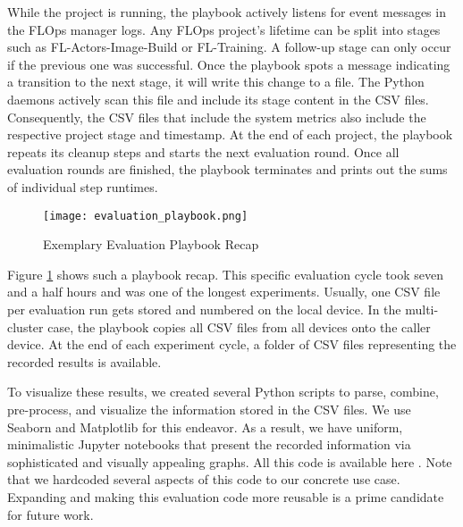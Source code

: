 While the project is running, the playbook actively listens for event messages in the FLOps manager logs.
Any FLOps project's lifetime can be split into stages such as FL-Actors-Image-Build or FL-Training.
A follow-up stage can only occur if the previous one was successful.
Once the playbook spots a message indicating a transition to the next stage, it will write this change to a file.
The Python daemons actively scan this file and include its stage content in the CSV files.
Consequently, the CSV files that include the system metrics also include the respective project stage and timestamp.
At the end of each project, the playbook repeats its cleanup steps and starts the next evaluation round.
Once all evaluation rounds are finished, the playbook terminates and prints out the sums of individual step runtimes. 
\begin{figure}[h]
        \centering
        \texttt{[image: evaluation\_playbook.png]}
        \caption{Exemplary Evaluation Playbook Recap}
        \label{fig:evaluation_playbook_result}
\end{figure}
Figure \ref{fig:evaluation_playbook_result} shows such a playbook recap.
This specific evaluation cycle took seven and a half hours and was one of the longest experiments.
Usually, one CSV file per evaluation run gets stored and numbered on the local device.
In the multi-cluster case, the playbook copies all CSV files from all devices onto the caller device.
At the end of each experiment cycle, a folder of CSV files representing the recorded results is available.

To visualize these results, we created several Python scripts to parse, combine, pre-process, and visualize the information stored in the CSV files.
We use Seaborn and Matplotlib for this endeavor.
As a result, we have uniform, minimalistic Jupyter notebooks that present the recorded information via sophisticated and visually appealing graphs.
All this code is available here \cite{cli_code}.
Note that we hardcoded several aspects of this code to our concrete use case.
Expanding and making this evaluation code more reusable is a prime candidate for future work.